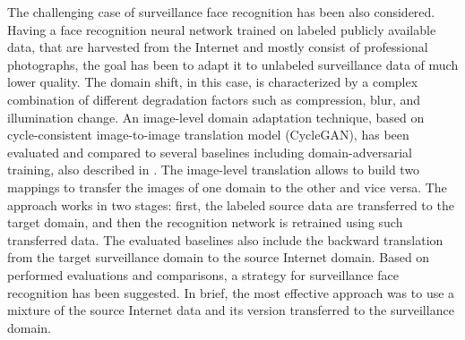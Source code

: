 The challenging case of surveillance face recognition has been also considered. Having a face recognition neural network trained on labeled publicly available data, that are harvested from the Internet and mostly consist of professional photographs, the goal has been to adapt it to unlabeled surveillance data of much lower quality. The domain shift, in this case, is characterized by a complex combination of different degradation factors such as compression, blur, and illumination change. An image-level domain adaptation technique, based on cycle-consistent image-to-image translation model (CycleGAN), has been evaluated and compared to several baselines including domain-adversarial training, also described in . The image-level translation allows to build two mappings to transfer the images of one domain to the other and vice versa. The approach works in two stages: first, the labeled source data are transferred to the target domain, and then the recognition network is retrained using such transferred data.  The evaluated baselines also include the backward translation from the target surveillance domain to the source Internet domain. Based on performed evaluations and comparisons, a strategy for surveillance face recognition has been suggested. In brief, the most effective approach was to use a mixture of the source Internet data and its version transferred to the surveillance domain.


